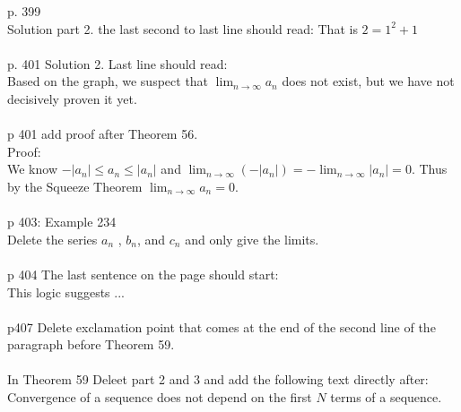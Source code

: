 \documentclass[10pt]{article}
\newcommand{\ds}{\displaystyle}
\begin{document}
p. 399 \\   
	
	Solution part 2. the last second to last line should read:   That is   $2=1^2+1$   \\ \\

p. 401 Solution 2. Last line should read: \\
	Based on the graph, we suspect that $\ds \lim_{n\to\infty} a_n$ does not exist, but we have not decisively proven it yet.   \\ \\

p 401 add proof after Theorem 56.\\
	Proof:    \\
We know $-|a_n|\leq a_n\leq |a_n|$ and $\ds \lim_{n\to \infty} (-|a_n|)=-\lim_{n\to\infty} |a_n|=0$. Thus by the Squeeze Theorem $\ds \lim_{n\to\infty} a_n =0$. \\ \\



p 403: Example 234 \\
	Delete the series $a_n$ , $b_n$, and $c_n$ and only give the limits.   \\ \\

p 404  The last sentence on the page should start:\\
This logic suggests ...  \\ \\

p407  Delete exclamation point that comes at the end of the second line of the paragraph before Theorem 59. \\ \\

	In Theorem 59 Deleet part 2 and 3 and add the following text directly after: \\

	Convergence of a sequence does not depend on the first $N$ terms of a sequence. \\ \\ %
\end{document}
